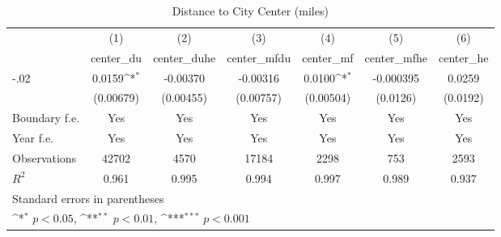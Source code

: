 \begin{table}[htbp]\centering
\def\sym#1{\ifmmode^{#1}\else\(^{#1}\)\fi}
\caption{Distance to City Center (miles)}
\begin{tabular}{l*{6}{c}}
\hline\hline
                    &\multicolumn{1}{c}{(1)}&\multicolumn{1}{c}{(2)}&\multicolumn{1}{c}{(3)}&\multicolumn{1}{c}{(4)}&\multicolumn{1}{c}{(5)}&\multicolumn{1}{c}{(6)}\\
                    &\multicolumn{1}{c}{center\_du}&\multicolumn{1}{c}{center\_duhe}&\multicolumn{1}{c}{center\_mfdu}&\multicolumn{1}{c}{center\_mf}&\multicolumn{1}{c}{center\_mfhe}&\multicolumn{1}{c}{center\_he}\\
\hline
-.02                &      0.0159\sym{*}  &    -0.00370         &    -0.00316         &      0.0100\sym{*}  &   -0.000395         &      0.0259         \\
                    &   (0.00679)         &   (0.00455)         &   (0.00757)         &   (0.00504)         &    (0.0126)         &    (0.0192)         \\
[1em]
Boundary f.e.       &         Yes         &         Yes         &         Yes         &         Yes         &         Yes         &         Yes         \\
[1em]
Year f.e.           &         Yes         &         Yes         &         Yes         &         Yes         &         Yes         &         Yes         \\
\hline
Observations        &       42702         &        4570         &       17184         &        2298         &         753         &        2593         \\
\(R^{2}\)           &       0.961         &       0.995         &       0.994         &       0.997         &       0.989         &       0.937         \\
\hline\hline
\multicolumn{7}{l}{\footnotesize Standard errors in parentheses}\\
\multicolumn{7}{l}{\footnotesize \sym{*} \(p<0.05\), \sym{**} \(p<0.01\), \sym{***} \(p<0.001\)}\\
\end{tabular}
\end{table}
